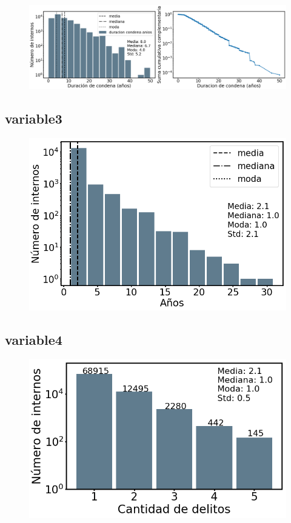 \documentclass[10pt]{article}
\begin{document}
\begin{figure}[H]
	\centering
	\includegraphics[scale=0.28]{graficos/duracion.png}
	\caption{}
\end{figure}

\subsection{variable3}

\begin{figure}[H]
	\centering
	\includegraphics[scale=0.3]{graficos/diff_condenado_detencion.png}
	\caption{}
\end{figure}

\subsection{variable4}

\begin{figure}[H]
	\centering
	\includegraphics[scale=0.4]{graficos/cantidad_delitos.png}
	\caption{}
\end{figure}
\end{document}
